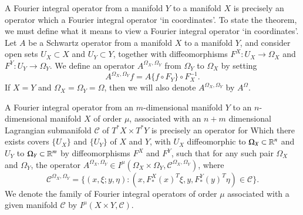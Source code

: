 %
%
%
%

A Fourier integral operator from a manifold $Y$ to a manifold $X$ is precisely an operator which a Fourier integral operator `in coordinates'. To state the theorem, we must define what it means to view a Fourier integral operator `in coordinates'. Let $A$ be a Schwartz operator from a manifold $X$ to a manifold $Y$, and consider open sets $U_X \subset X$ and $U_Y \subset Y$, together with diffeomorphisms $F^X: U_X \to \Omega_X$ and $F^Y: U_Y \to \Omega_Y$. We define an operator $A^{\Omega_X, \Omega_Y}$ from $\Omega_Y$ to $\Omega_X$ by setting
%
\begin{equation}
  A^{\Omega_X, \Omega_Y} f = A \{ f \circ F_Y \} \circ F_X^{-1}.
\end{equation}
%
If $X = Y$ and $\Omega_X = \Omega_Y = \Omega$, then we will also denote $A^{\Omega_X,\Omega_Y}$ by $A^{\Omega}$.

A Fourier integral operator from an $m$-dimensional manifold $Y$ to an $n$-dimensional manifold $X$ of order $\mu$, associated with an $n + m$ dimensional Lagrangian submanifold $\mathcal{C}$ of $T^* X \times T^* Y$ is precisely an operator for Which there exists covers $\{ U_X \}$ and $\{ U_Y \}$ of $X$ and $Y$, with $U_X$ diffeomorphic to $\Omega_X \subset \operatorname{\mathbb{R}}^n$ and $U_Y$ to $\Omega_Y \subset \operatorname{\mathbb{R}}^m$ by diffeomorphisms $F^X$ and $F^Y$, such that for any such pair $\Omega_X$ and $\Omega_Y$, the operator $A^{\Omega_X, \Omega_Y} \in I^\mu( \Omega_X \times \Omega_Y, \mathcal{C}^{\Omega_X, \Omega_Y} )$, where
%
\begin{equation}
  \mathcal{C}^{\Omega_X,\Omega_Y} = \{ (x,\xi;y,\eta) : (x, F^X_{\!*}(x)^T \xi, y, F^Y_*(y)^T \eta) \in \mathcal{C} \}.
\end{equation}
%
We denote the family of Fourier integral operators of order $\mu$ associated with a given manifold $\mathcal{C}$ by $I^\mu(X \times Y,\mathcal{C})$.

